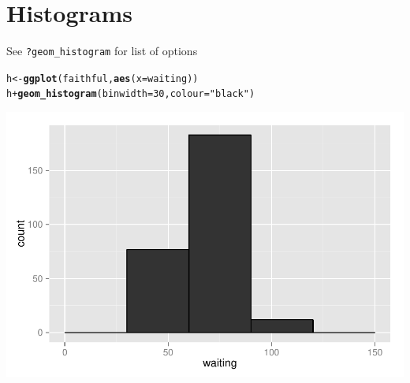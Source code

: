\documentclass{beamer}\usepackage[]{graphicx}\usepackage[]{color}
\makeatletter
\newcommand{\hlnum}[1]{\textcolor[rgb]{0.686,0.059,0.569}{#1}}%
\newcommand{\hlstr}[1]{\textcolor[rgb]{0.192,0.494,0.8}{#1}}%
\newcommand{\hlopt}[1]{\textcolor[rgb]{0,0,0}{#1}}%
\newcommand{\hlstd}[1]{\textcolor[rgb]{0.345,0.345,0.345}{#1}}%
\newcommand{\hlkwb}[1]{\textcolor[rgb]{0.69,0.353,0.396}{#1}}%
\newcommand{\hlkwc}[1]{\textcolor[rgb]{0.333,0.667,0.333}{#1}}%
\newcommand{\hlkwd}[1]{\textcolor[rgb]{0.737,0.353,0.396}{\textbf{#1}}}%
\newenvironment{kframe}{%
 \def\at@end@of@kframe{}%
 \ifinner\ifhmode%
  \def\at@end@of@kframe{\end{minipage}}%
  \begin{minipage}{\columnwidth}%
 \fi\fi%
 \def\FrameCommand##1{\hskip\@totalleftmargin \hskip-\fboxsep
 \colorbox{shadecolor}{##1}\hskip-\fboxsep
     \hskip-\linewidth \hskip-\@totalleftmargin \hskip\columnwidth}%
 \MakeFramed {\advance\hsize-\width
   \@totalleftmargin\z@ \linewidth\hsize
   \@setminipage}}%
 {\par\unskip\endMakeFramed%
 \at@end@of@kframe}
\newenvironment{knitrout}{}{} %
\makeatother
\begin{document}

\section*{Histograms}
\frame{\sectionpage}


\begin{frame}[fragile]
See \texttt{?geom\_histogram} for list of options
\begin{knitrout}\footnotesize
{}\color{fgcolor}\begin{kframe}
\begin{alltt}
\hlstd{h} \hlkwb{<-} \hlkwd{ggplot}\hlstd{(faithful,} \hlkwd{aes}\hlstd{(}\hlkwc{x} \hlstd{= waiting))}
\hlstd{h} \hlopt{+} \hlkwd{geom_histogram}\hlstd{(}\hlkwc{binwidth} \hlstd{=} \hlnum{30}\hlstd{,} \hlkwc{colour} \hlstd{=} \hlstr{"black"}\hlstd{)}
\end{alltt}
\end{kframe}

{\centering \includegraphics[width=.75\linewidth]{figure/histogr} 

}



\end{knitrout}

\end{frame}

\end{document}
